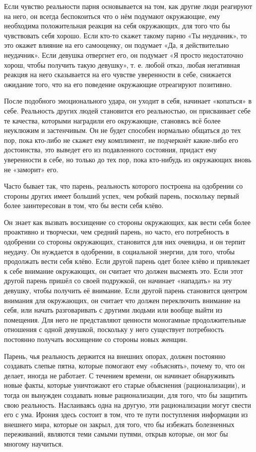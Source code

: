 Если чувство реальности парня основывается на том, как другие люди реагируют на него, он всегда беспокоиться что о нём подумают окружающие, ему необходима положительная реакция на себя окружающих, для того что бы чувствовать себя хорошо. Если кто-то скажет такому парню «Ты неудачник», то это окажет влияние на его самооценку, он подумает «Да, я действительно неудачник». Если девушка отвергнет его, он подумает «Я просто недостаточно хорош, чтобы получить такую девушку», т. е. любой отказ, любая негативная реакция на него сказывается на его чувстве уверенности в себе, снижается ожидание того, что на его поведение окружающие отреагируют позитивно.

После подобного эмоционального удара, он уходит в себя, начинает «копаться» в себе. Реальность других людей становится его реальностью, он присваивает себе те качества, которыми наградили его окружающие, становясь всё более неуклюжим и застенчивым. Он не будет способен нормально общаться до тех пор, пока кто-либо не скажет ему комплимент, не подчеркнёт какие-либо его достоинства, это выведет его из подавленного состояния, придаст ему уверенности в себе, но только до тех пор, пока кто-нибудь из окружающих вновь не «заморит» его.

Часто бывает так, что парень, реальность которого построена на одобрении со стороны других имеет больший успех, чем робкий парень, поскольку первый более заинтересован в том, что бы вести себя клёво.

Он знает как вызвать восхищение со стороны окружающих, как вести себя более проактивно и творчески, чем средний парень, но часто, его потребность в одобрении со стороны окружающих, становится для них очевидна, и он терпит неудачу. Он нуждается в одобрении, в социальной энергии, для того, чтобы продолжать вести себя клёво. Если другой парень одет более клёво и привлекает к себе внимание окружающих, он считает что должен высмеять это. Если этот другой парень пришёл со своей подружкой, он начинает «нападать» на эту девушку, чтобы получить её внимание. Если другой парень становится центром внимания для окружающих, он считает что должен переключить внимание на себя, или начать разговаривать с другими людьми или вообще выйти из помещения. Для него не представляют ценности моногамные продолжительные отношения с одной девушкой, поскольку у него существует потребность постоянно получать восхищение со стороны новых женщин.

Парень, чья реальность держится на внешних опорах, должен постоянно создавать слепые пятна, которые помогают ему «объяснять», почему то, что он делает, иногда не работает. С течением времени, он начинает обнаруживать новые факты, которые уничтожают его старые объяснения (рационализации), и тогда он вынужден создавать новые рационализации, для того, что бы защитить свою реальность. Наслаиваясь одна на другую, эти рационализации могут свести его с ума. Ирония здесь состоит в том, что те пути поступления информации из внешнего мира, которые он закрыл, для того, что бы избежать болезненных переживаний, являются теми самыми путями, открыв которые, он мог бы многому научиться.

